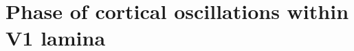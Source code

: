 \chapter{Phase of cortical oscillations within V1 lamina}
\label{ch:plam}

\graphicspath{{Chapters/laminar-phase/figs/}}

